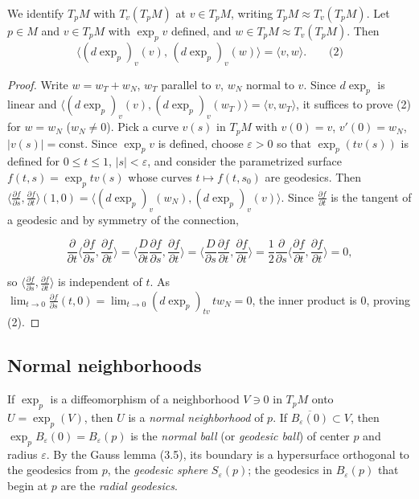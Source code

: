 \begin{lemma}[Gauss]
  \label{lem:dc-ch3-3-5}


  We identify $T_pM$ with $T_v(T_pM)$ at $v\in T_pM$, writing $T_pM\approx T_v(T_pM)$.
  Let $p\in M$ and $v\in T_pM$ with $\exp_p v$ defined, and $w\in T_pM\approx T_v(T_pM)$.
  Then
  $$
  \langle(d\exp_p)_v(v),\,(d\exp_p)_v(w)\rangle=\langle v,w\rangle.\qquad\text{(2)}
  $$
\end{lemma}
\begin{proof}
  \sketch
  Write $w=w_T+w_N$, $w_T$ parallel to $v$, $w_N$ normal to $v$. Since
  $d\exp_p$ is linear and
  $\langle(d\exp_p)_v(v),(d\exp_p)_v(w_T)\rangle=\langle v,w_T\rangle$, it suffices
  to prove (2) for $w=w_N$ ($w_N\ne 0$). Pick a curve $v(s)$ in $T_pM$ with
  $v(0)=v$, $v'(0)=w_N$, $|v(s)|=\text{const}$. Since $\exp_p v$ is defined,
  choose $\varepsilon>0$ so that $\exp_p(tv(s))$ is defined for $0\le t\le 1$,
  $|s|<\varepsilon$, and consider the parametrized surface
  $f(t,s)=\exp_p tv(s)$ whose curves $t\mapsto f(t,s_0)$ are geodesics.
  Then $\langle\frac{\partial f}{\partial s},\frac{\partial f}{\partial t}\rangle(1,0)=\langle(d\exp_p)_v(w_N),(d\exp_p)_v(v)\rangle$.
  Since $\frac{\partial f}{\partial t}$ is the tangent of a geodesic and by symmetry
  of the connection,

  $$
  \frac{\partial}{\partial t}\Big\langle\frac{\partial f}{\partial s},\frac{\partial f}{\partial t}\Big\rangle=\Big\langle\frac{D}{\partial t}\frac{\partial f}{\partial s},\frac{\partial f}{\partial t}\Big\rangle=\Big\langle\frac{D}{\partial s}\frac{\partial f}{\partial t},\frac{\partial f}{\partial t}\Big\rangle=\frac12\frac{\partial}{\partial s}\Big\langle\frac{\partial f}{\partial t},\frac{\partial f}{\partial t}\Big\rangle=0,
  $$

  so $\langle\frac{\partial f}{\partial s},\frac{\partial f}{\partial t}\rangle$ is
  independent of $t$. As $\lim_{t\to0}\frac{\partial f}{\partial s}(t,0)=\lim_{t\to0}(d\exp_p)_{tv}\,t w_N=0$,
  the inner product is $0$, proving (2).
\end{proof}

\subsection{Normal neighborhoods}
If $\exp_p$ is a diffeomorphism of a neighborhood $V\ni 0$ in $T_pM$ onto
$U=\exp_p(V)$, then $U$ is a \emph{normal neighborhood} of $p$. If
$\overline{B_\varepsilon(0)}\subset V$, then $\exp_p B_\varepsilon(0)=B_\varepsilon(p)$
is the \emph{normal ball} (or \emph{geodesic ball}) of center $p$ and radius $\varepsilon$.
By the Gauss lemma (3.5), its boundary is a hypersurface orthogonal to the
geodesics from $p$, the \emph{geodesic sphere} $S_\varepsilon(p)$; the geodesics in
$B_\varepsilon(p)$ that begin at $p$ are the \emph{radial geodesics}.

